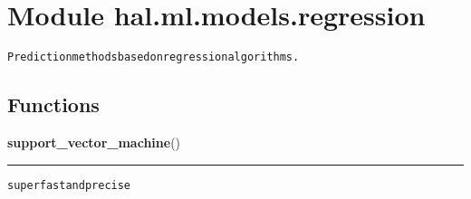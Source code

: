 %
%
%


\section{Module hal.ml.models.regression}

    \label{hal:ml:models:regression}
\begin{alltt}
Prediction methods based on regression algorithms. 
\end{alltt}



  \subsection{Functions}

    \label{hal:ml:models:regression:support_vector_machine}

    \vspace{0.5ex}

\hspace{.8\funcindent}\begin{boxedminipage}{\funcwidth}

    \raggedright \textbf{support\_vector\_machine}()

    \vspace{-1.5ex}

    \rule{\textwidth}{0.5\fboxrule}
\setlength{\parskip}{2ex}
\begin{alltt}
super fast and precise
    
\end{alltt}

\setlength{\parskip}{1ex}
    \end{boxedminipage}

